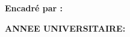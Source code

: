 \begin{titlepage}
\begin{center}
\begin{minipage}{0.72\textwidth}
\vspace{0.8cm}

{\Large\bfseries Encadré par :\par}
\vspace{0.15cm}
{\large  \encadrantEcole\par}
\end{minipage}

\vfill

{\Large\bfseries ANNEE UNIVERSITAIRE: \anneeUniversitaire\par}

\end{center}
\end{titlepage}
